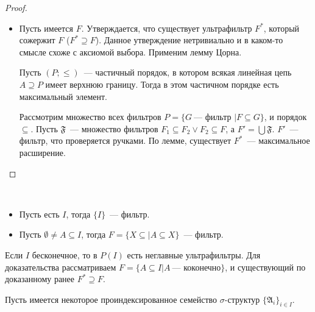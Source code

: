 \begin{proof}
\begin{itemize}
        \item Пусть имеется $F$. Утверждается, что существует ультрафильтр $F^*$, который сожержит $F$ ($F^* \supseteq F$). Данное утверждение нетривиально и в каком-то смысле схоже с аксиомой выбора. Применим лемму Цорна. \\ 
        
        \begin{lemma}[Цорн]
            Пусть $(P; \leq)$~— частичный порядок, в котором всякая линейная цепь $A \supseteq P$ имеет верхнюю границу. Тогда в этом частичном порядке есть максимальный элемент. 
        \end{lemma} 

        Рассмотрим множество всех фильтров $P = \{G~— \text{ фильтр }| F \subseteq G\}$, и порядок $\subseteq$. Пусть $\mathfrak{F}$~— множество фильтров $F_1 \subseteq F_2 \vee F_2 \subseteq F$, а $F' = \bigcup \mathfrak{F}$. $F'$~— фильтр, что проверяется ручками. По лемме, существует $F^*$~— максимальное расширение. 
    \end{itemize}
\end{proof} 

\begin{exmpl} \ 
    \begin{itemize}
        \item Пусть есть $I$, тогда $\{I\}$~— фильтр. 
        \item Пусть $\emptyset \neq A \subseteq I$, тогда $F = \{X \subseteq | A \subseteq X\}$~— фильтр.
    \end{itemize}
\end{exmpl}

\begin{task}
    Если $I$ бесконечное, то в $P(I)$ есть неглавные ультрафильтры. Для доказательства рассматриваем $F = \{A \subseteq I | A~— \text{ коконечно}\}$, и существующий по доказанному ранее $F^* \supseteq F$. 
\end{task} 

Пусть имеется некоторое проиндексированное семейство $\sigma$-структур $\{\mathfrak{A}_i\}_{i \in I}$.  

